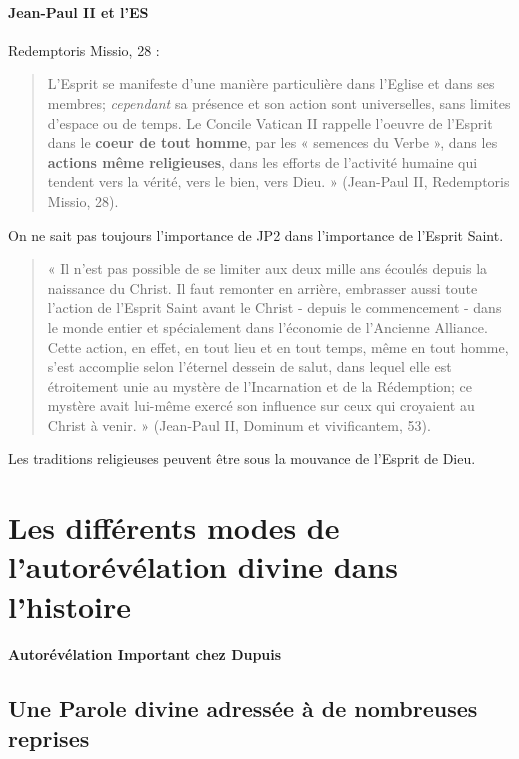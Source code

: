 \paragraph{Jean-Paul II et l'ES} Redemptoris Missio, 28 : 

\begin{quote}
    L'Esprit se manifeste d'une manière particulière dans l'Eglise et dans ses membres; \textit{cependant} sa
présence et son action sont universelles, sans limites d'espace ou de temps. Le Concile Vatican II
rappelle l'oeuvre de l'Esprit dans le \textbf{coeur de tout homme}, par les « semences du Verbe », dans les
\textbf{actions même religieuses}, dans les efforts de l'activité humaine qui tendent vers la vérité, vers le bien,
vers Dieu. » (Jean-Paul II, Redemptoris Missio, 28).
\end{quote}
 On ne sait pas toujours l'importance de JP2 dans l'importance de l'Esprit Saint.


 \begin{quote}
     « Il n'est pas possible de se limiter aux deux mille ans écoulés depuis la naissance du Christ. Il faut
remonter en arrière, embrasser aussi toute l'action de l'Esprit Saint avant le Christ - depuis le
commencement - dans le monde entier et spécialement dans l'économie de l'Ancienne Alliance. Cette
action, en effet, en tout lieu et en tout temps, même en tout homme, s'est accomplie selon l'éternel
dessein de salut, dans lequel elle est étroitement unie au mystère de l'Incarnation et de la Rédemption;
ce mystère avait lui-même exercé son influence sur ceux qui croyaient au Christ à venir. » (Jean-Paul
II, Dominum et vivificantem, 53).
 \end{quote}
Les traditions religieuses peuvent être sous la mouvance de l'Esprit de Dieu.





\section{Les différents modes de l’autorévélation divine dans l’histoire}

\paragraph{Autorévélation Important chez Dupuis}


\subsection{Une Parole divine adressée à de nombreuses reprises}

